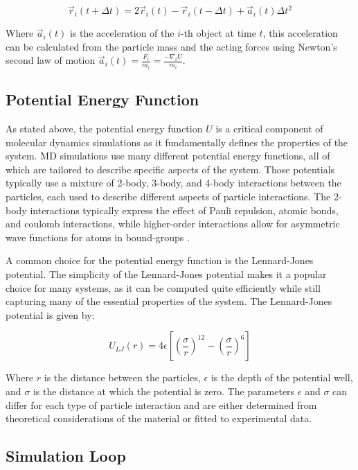 \begin{equation}
      \vec{r}_i(t + \Delta t) = 2 \vec{r}_i(t) - \vec{r}_i(t - \Delta t) + \vec{a}_i(t) \Delta t^2
\end{equation}

Where $\vec{a}_i(t)$ is the acceleration of the $i$-th object at time $t$, this acceleration can be calculated from the particle mass and the acting forces using Newton's second law of motion $\vec{a}_i(t) =\frac{F_i}{m_i}= \frac{-\nabla_i U}{m_i}$.

\subsection{Potential Energy Function}

As stated above, the potential energy function $U$ is a critical component of molecular dynamics simulations as it fundamentally defines the properties of the system. MD simulations use many different potential energy functions, all of which are tailored to describe specific aspects of the system. Those potentials typically use a mixture of 2-body, 3-body, and 4-body interactions between the particles, each used to describe different aspects of particle interactions. The 2-body interactions typically express the effect of Pauli repulsion, atomic bonds, and coulomb interactions, while higher-order interactions allow for asymmetric wave functions for atoms in bound-groups \cite{Leimkuhler2015}.

A common choice for the potential energy function is the Lennard-Jones potential. The simplicity of the Lennard-Jones potential makes it a popular choice for many systems, as it can be computed quite efficiently while still capturing many of the essential properties of the system. The Lennard-Jones potential is given by:

\begin{equation}
      U_{LJ}(r) = 4 \epsilon \left[ \left( \frac{\sigma}{r} \right)^{12} - \left( \frac{\sigma}{r} \right)^6 \right]
\end{equation}


Where $r$ is the distance between the particles, $\epsilon$ is the depth of the potential well, and $\sigma$ is the distance at which the potential is zero. The parameters $\epsilon$ and $\sigma$ can differ for each type of particle interaction and are either determined from theoretical considerations of the material or fitted to experimental data.

\subsection{Simulation Loop}

